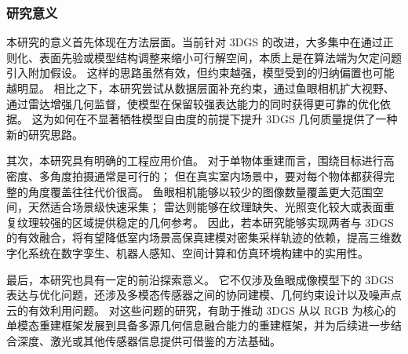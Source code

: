 \subsubsection{研究意义}

本研究的意义首先体现在方法层面。当前针对 3DGS 的改进，大多集中在通过正则化、表面先验或模型结构调整来缩小可行解空间，本质上是在算法端为欠定问题引入附加假设。
这样的思路虽然有效，但约束越强，模型受到的归纳偏置也可能越明显。
相比之下，本研究尝试从数据层面补充约束，通过鱼眼相机扩大视野、通过雷达增强几何监督，使模型在保留较强表达能力的同时获得更可靠的优化依据。
这为如何在不显著牺牲模型自由度的前提下提升 3DGS 几何质量提供了一种新的研究思路。

其次，本研究具有明确的工程应用价值。
对于单物体重建而言，围绕目标进行高密度、多角度拍摄通常是可行的；
但在真实室内场景中，要对每个物体都获得完整的角度覆盖往往代价很高。
鱼眼相机能够以较少的图像数量覆盖更大范围空间，天然适合场景级快速采集；
雷达则能够在纹理缺失、光照变化较大或表面重复纹理较强的区域提供稳定的几何参考。
因此，若本研究能够实现两者与 3DGS 的有效融合，将有望降低室内场景高保真建模对密集采样轨迹的依赖，提高三维数字化系统在数字孪生、机器人感知、空间计算和仿真环境构建中的实用性。

最后，本研究也具有一定的前沿探索意义。
它不仅涉及鱼眼成像模型下的 3DGS 表达与优化问题，还涉及多模态传感器之间的协同建模、几何约束设计以及噪声点云的有效利用问题。
对这些问题的研究，有助于推动 3DGS 从以 RGB 为核心的单模态重建框架发展到具备多源几何信息融合能力的重建框架，并为后续进一步结合深度、激光或其他传感器信息提供可借鉴的方法基础。
